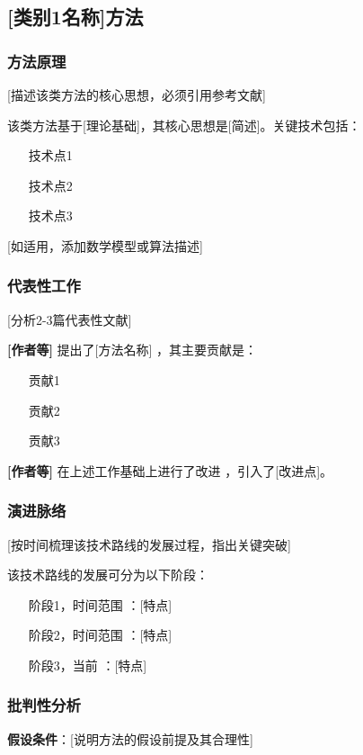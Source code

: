\documentclass[journal]{IEEEtran}
\begin{document}
\subsection{[类别1名称]方法}

\subsubsection{方法原理}
[描述该类方法的核心思想，必须引用参考文献]

该类方法基于[理论基础]，其核心思想是[简述]。关键技术包括：
\begin{itemize}
    \item [技术点1] \cite{ref1, ref2}
    \item [技术点2] \cite{ref3}
    \item [技术点3] \cite{ref4}
\end{itemize}

[如适用，添加数学模型或算法描述]

\subsubsection{代表性工作}
[分析2-3篇代表性文献]

\textbf{[作者等]} 提出了[方法名称] \cite{ref1}，其主要贡献是：
\begin{itemize}
    \item [贡献1]
    \item [贡献2]
    \item [贡献3]
\end{itemize}

\textbf{[作者等]} 在上述工作基础上进行了改进 \cite{ref2}，引入了[改进点]。

\subsubsection{演进脉络}
[按时间梳理该技术路线的发展过程，指出关键突破]

该技术路线的发展可分为以下阶段：
\begin{enumerate}
    \item [阶段1，时间范围]：[特点] \cite{ref1}
    \item [阶段2，时间范围]：[特点] \cite{ref2, ref3}
    \item [阶段3，当前]：[特点] \cite{ref4}
\end{enumerate}

\subsubsection{批判性分析}
\textbf{假设条件}：[说明方法的假设前提及其合理性]
\end{document}
